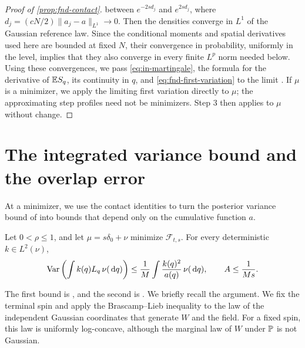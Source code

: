 \begin{proof}[Proof of \cref{prop:fnd-contact}]
between $e^{-2sd_j}$ and $e^{2sd_j}$, where
$d_j=(cN/2)\|a_j-a\|_{L^1}\to0$. Then the densities converge in $L^1$ of
the Gaussian reference law. Since the conditional moments and spatial derivatives used here are
bounded at fixed $N$, their convergence in probability, uniformly in the
level, implies that they also converge in every finite $L^p$ norm
needed below.
Using these convergences, we pass \eqref{eq:in-martingale}, the formula for the
derivative of $\mathbb E S_q$, its continuity in $q$, and
\eqref{eq:fnd-first-variation} to the limit \cite[Section~2.6.2]{AL}.
If $\mu$ is a minimizer, we apply the limiting first variation directly
to $\mu$; the approximating step profiles need not be minimizers. Step 3
then applies to $\mu$ without change.
\end{proof}

\section{The integrated variance bound and the overlap error}
\label{sec:fnd-variance}

At a minimizer, we use the contact identities to turn the posterior
variance bound
of \cite[Proposition~2.2]{AL} into bounds that depend only on the
cumulative function $a$.

\begin{proposition}
\label{prop:fnd-variance}
Let $0<\rho\le1$, and let $\mu=s\delta_0+\nu$ minimize
$\mathcal F_{t,s}$. For every deterministic $k\in L^2(\nu)$,
\begin{equation}\label{eq:in-Lvar}
 \operatorname{Var}\left(\int k(q)L_q\,\nu(\,\mathrm d q)\right)
      \le\frac1M\int\frac{k(q)^2}{a(q)}\,\nu(\,\mathrm d q),
 \qquad A\le\frac1{Ms}.
\end{equation}
\end{proposition}

The first bound is \cite[Proposition~2.2, (2.16)]{AL}, and the second
is \cite[Section~2.5, (2.18)]{AL}. We briefly recall the argument. We fix
the terminal spin and apply the
Brascamp--Lieb inequality to the law of the independent Gaussian
coordinates that generate $W$ and the field. For a fixed spin, this law
is uniformly log-concave, although the
marginal law of $W$ under $\mathbb P$ is not Gaussian.

